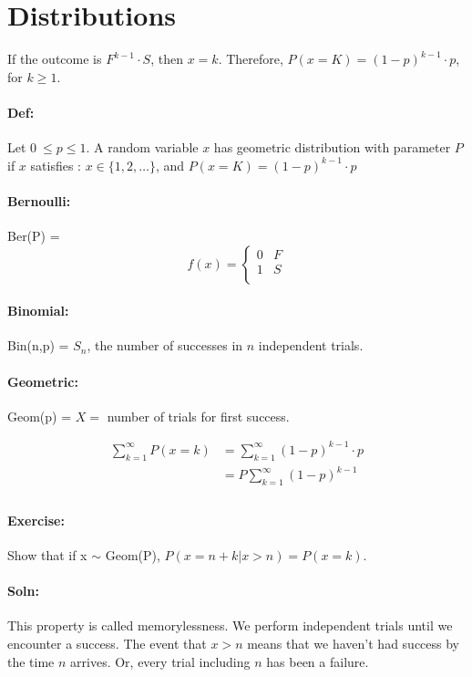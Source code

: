\documentclass{article}
\begin{document}
\section{Distributions}
If the outcome is $F^{k-1}\cdot S$, then $x = k$. Therefore, $P(x = K) = (1-p)^{k-1} \cdot p$, for $ k \ge 1$.
\paragraph{Def:} Let $0\ \le p \le 1$. A random variable $x$ has geometric distribution with parameter $P$ if 
$x$ satisfies : $x \in \{1, 2, \ldots\}$, and $P(x = K) = (1-p)^{k-1} \cdot p$

\paragraph{Bernoulli:} Ber(P) = \[ f(x) = \begin{cases}
    0 & F \\
    1 & S \\
    \end{cases}
\]

\paragraph{Binomial:} Bin(n,p) = $S_n$, the number of successes in $n$ independent trials.

\paragraph{Geometric: } Geom(p) = $X = $ number of trials for first success.

\begin{align*}
    \sum_{k=1}^{\infty} P(x = k) &= \sum_{k=1}^{\infty} (1-p)^{k-1} \cdot p \\
                                 &= P \sum_{k=1}^{\infty} (1-p)^{k-1} \\
\end{align*}

\paragraph{Exercise: } Show that if x $\sim$ Geom(P), $P(x = n+k | x > n) = P(x = k)$. 
\paragraph{Soln:} This property is called memorylessness. We perform independent trials until we encounter 
a success. The event that $x > n$ means that we haven't had success by the time $n$ arrives. Or, every trial
including $n$ has been a failure.
\end{document}
